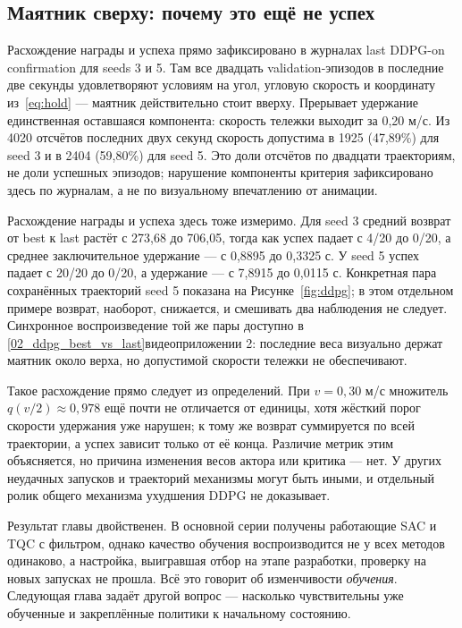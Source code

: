 \subsection{Маятник сверху: почему это ещё не успех}
Расхождение награды и успеха прямо зафиксировано в журналах last DDPG-on confirmation для seeds 3 и 5. Там все двадцать validation-эпизодов в последние две секунды удовлетворяют условиям на угол, угловую скорость и координату из~\eqref{eq:hold} — маятник действительно стоит вверху. Прерывает удержание единственная оставшаяся компонента: скорость тележки выходит за 0,20 м/с. Из 4020 отсчётов последних двух секунд скорость допустима в 1925 (47,89\%) для seed 3 и в 2404 (59,80\%) для seed 5. Это доли отсчётов по двадцати траекториям, не доли успешных эпизодов; нарушение компоненты критерия зафиксировано здесь по журналам, а не по визуальному впечатлению от анимации.

Расхождение награды и успеха здесь тоже измеримо. Для seed 3 средний возврат от best к last растёт с 273,68 до 706,05, тогда как успех падает с 4/20 до 0/20, а среднее заключительное удержание — с 0,8895 до 0,3325 с. У seed 5 успех падает с 20/20 до 0/20, а удержание — с 7,8915 до 0,0115 с. Конкретная пара сохранённых траекторий seed 5 показана на Рисунке~\ref{fig:ddpg}; в этом отдельном примере возврат, наоборот, снижается, и смешивать два наблюдения не следует. Синхронное воспроизведение той же пары доступно в \vref{02_ddpg_best_vs_last}{видеоприложении 2}: последние веса визуально держат маятник около верха, но допустимой скорости тележки не обеспечивают.

Такое расхождение прямо следует из определений. При $v=0{,}30$ м/с множитель $q(v/2)\approx0{,}978$ ещё почти не отличается от единицы, хотя жёсткий порог скорости удержания уже нарушен; к тому же возврат суммируется по всей траектории, а успех зависит только от её конца. Различие метрик этим объясняется, но причина изменения весов актора или критика — нет. У других неудачных запусков и траекторий механизмы могут быть иными, и отдельный ролик общего механизма ухудшения DDPG не доказывает.

Результат главы двойственен. В основной серии получены работающие SAC и TQC с фильтром, однако качество обучения воспроизводится не у всех методов одинаково, а настройка, выигравшая отбор на этапе разработки, проверку на новых запусках не прошла. Всё это говорит об изменчивости \emph{обучения}. Следующая глава задаёт другой вопрос — насколько чувствительны уже обученные и закреплённые политики к начальному состоянию.
